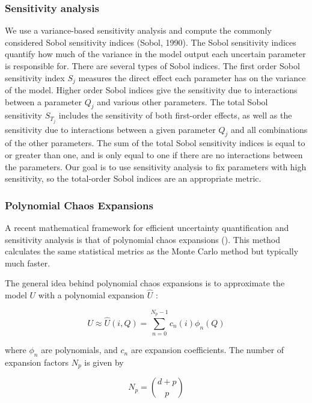 \documentclass[utf8]{frontiersSCNS}
\begin{document}
\subsubsection{Sensitivity analysis}

We use a variance-based sensitivity analysis and compute the commonly considered Sobol sensitivity indices
(Sobol, 1990). The Sobol sensitivity indices quantify how much of the variance in the model output each
uncertain parameter is responsible for. There are several types of Sobol indices. The first order Sobol
sensitivity index $S_j$ measures the direct effect each parameter has on the variance of the model. Higher order
Sobol indices give the sensitivity due to interactions between a parameter $Q_j$ and various other parameters.
The total Sobol sensitivity $S_{T_{j}}$ includes the sensitivity of both first-order effects, as well as the
sensitivity due to interactions between a given parameter $Q_j$ and all combinations of the other
parameters. The sum of the total Sobol sensitivity indices is equal to or greater than one, and is only equal to
one if there are no interactions between the parameters. Our goal is to use sensitivity analysis to fix
parameters with high sensitivity, so the total-order Sobol indices are an appropriate metric.

\subsubsection{Polynomial Chaos Expansions}

A recent mathematical framework for efficient uncertainty quantification and sensitivity analysis is that of
polynomial chaos expansions (\cite{Xiu_2005}). This method calculates the same statistical metrics as the Monte
Carlo method but typically much faster.

The general idea behind polynomial chaos expansions is to approximate the model $U$ with a polynomial expansion
$\hat{U}$ : 

\begin{equation} U \approx \hat{U}(i, Q) = \sum_{n=0}^{N_p-1} c_n(i) \phi_n(Q) \end{equation}

where $\phi_n$ are polynomials, and $c_n$ are expansion coefficients. The number of expansion factors $N_p$ is
given by

\begin{equation}
  N_p = \binom{d+p}{p}
\end{equation}
\end{document}
